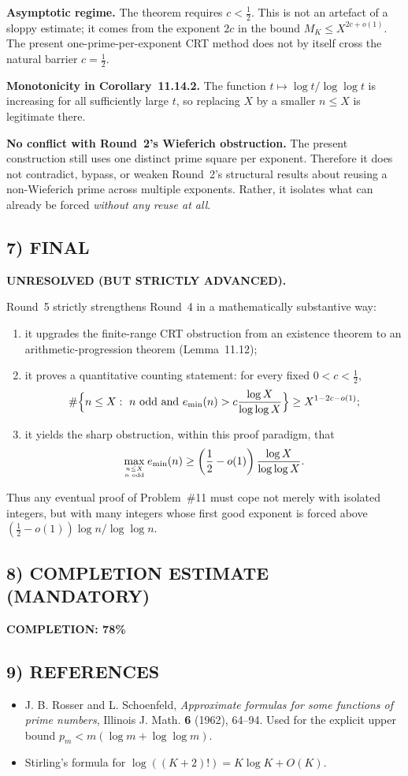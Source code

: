 \textbf{Asymptotic regime.} The theorem requires $c<\tfrac12$. This is not an artefact of a sloppy estimate; it comes from the exponent $2c$ in the bound $M_K\le X^{2c+o(1)}$. The present one-prime-per-exponent CRT method does not by itself cross the natural barrier $c=\tfrac12$.

\textbf{Monotonicity in Corollary~11.14.2.} The function $t\mapsto \log t/\log\log t$ is increasing for all sufficiently large $t$, so replacing $X$ by a smaller $n\le X$ is legitimate there.

\textbf{No conflict with Round~2's Wieferich obstruction.} The present construction still uses one distinct prime square per exponent. Therefore it does not contradict, bypass, or weaken Round~2's structural results about reusing a non-Wieferich prime across multiple exponents. Rather, it isolates what can already be forced \emph{without any reuse at all}.

\subsection{7) FINAL}
\textbf{UNRESOLVED (BUT STRICTLY ADVANCED).}

Round~5 strictly strengthens Round~4 in a mathematically substantive way:
\begin{enumerate}
\item it upgrades the finite-range CRT obstruction from an existence theorem to an arithmetic-progression theorem (Lemma~11.12);
\item it proves a quantitative counting statement: for every fixed $0<c<\tfrac12$,
\[
 \#\Bigl\{n\le X:\ n\text{ odd and }e_{\min}(n)>c\frac{\log X}{\log\log X}\Bigr\}\ge X^{1-2c-o(1)};
\]
\item it yields the sharp obstruction, within this proof paradigm, that
\[
 \max_{n\le X\atop n\text{ odd}} e_{\min}(n)
 \ge \left(\frac12-o(1)\right)\frac{\log X}{\log\log X}.
\]
\end{enumerate}
Thus any eventual proof of Problem~\#11 must cope not merely with isolated integers, but with many integers whose first good exponent is forced above $(\tfrac12-o(1))\log n/\log\log n$.

\subsection{8) COMPLETION ESTIMATE (MANDATORY)}
\textbf{COMPLETION: 78\%}

\subsection{9) REFERENCES}
\begin{itemize}
\item J. B. Rosser and L. Schoenfeld, \emph{Approximate formulas for some functions of prime numbers}, Illinois J. Math. \textbf{6} (1962), 64--94. Used for the explicit upper bound $p_m<m(\log m+\log\log m)$.
\item Stirling's formula for $\log((K+2)!)=K\log K+O(K)$.
\end{itemize}
